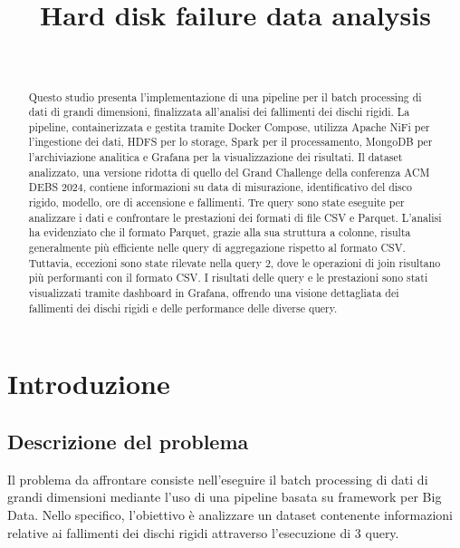 \documentclass[conference]{IEEEtran}
\begin{document}
\title{Hard disk failure data analysis\\}

\author{
\and
{}
\\
}


\maketitle
\thispagestyle{plain}
\pagestyle{plain}

\begin{abstract}
    Questo studio presenta l'implementazione di una pipeline per il batch processing di dati di grandi dimensioni, finalizzata all'analisi dei fallimenti dei dischi rigidi. La pipeline, containerizzata e gestita tramite Docker Compose, utilizza Apache NiFi per l'ingestione dei dati, HDFS per lo storage, Spark per il processamento, MongoDB per l'archiviazione analitica e Grafana per la visualizzazione dei risultati. Il dataset analizzato, una versione ridotta di quello del Grand Challenge della conferenza ACM DEBS 2024, contiene informazioni su data di misurazione, identificativo del disco rigido, modello, ore di accensione e fallimenti. Tre query sono state eseguite per analizzare i dati e confrontare le prestazioni dei formati di file CSV e Parquet. L'analisi ha evidenziato che il formato Parquet, grazie alla sua struttura a colonne, risulta generalmente più efficiente nelle query di aggregazione rispetto al formato CSV. Tuttavia, eccezioni sono state rilevate nella query 2, dove le operazioni di join risultano più performanti con il formato CSV. I risultati delle query e le prestazioni sono stati visualizzati tramite dashboard in Grafana, offrendo una visione dettagliata dei fallimenti dei dischi rigidi e delle performance delle diverse query.
\end{abstract}

\section{Introduzione}
\subsection{Descrizione del problema}
Il problema da affrontare consiste nell'eseguire il batch processing di dati di grandi dimensioni mediante l'uso di una pipeline basata su framework per Big Data. Nello specifico, l'obiettivo è analizzare un dataset contenente informazioni relative ai fallimenti dei dischi rigidi attraverso l'esecuzione di 3 query.
\end{document}
